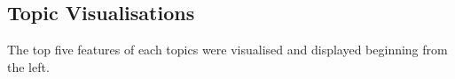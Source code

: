 \documentclass{article}
\begin{document}



\newpage
\begin{appendices}
\section{Topic Visualisations}\label{AppendixVisualisation}
The top five features of each topics were visualised and displayed beginning from the left.

\begin{figure}[h]
\centering
{}\par\medskip
{}\par\medskip    
{}\par\medskip        
{}\par\medskip            
{}

\label{TS}
\end{figure}
\end{appendices}
\end{document}
